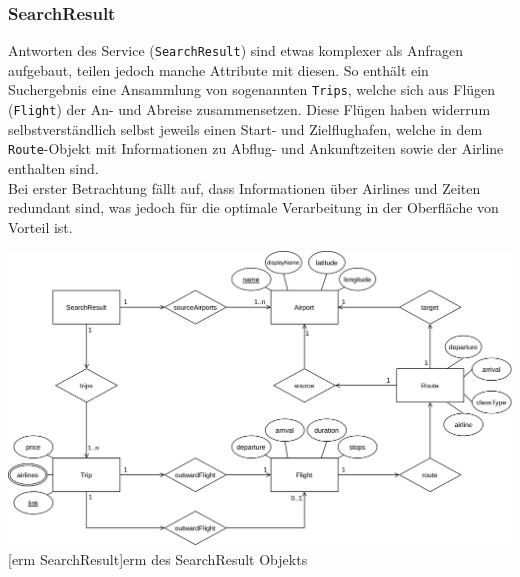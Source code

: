 \documentclass[12pt,twoside,a4paper]{article}
\begin{document}
\begin{sloppypar}
\subsubsection{SearchResult}
Antworten des Service (\texttt{SearchResult}) sind etwas komplexer als Anfragen aufgebaut, teilen jedoch manche Attribute mit diesen. So enthält ein Suchergebnis eine Ansammlung von sogenannten \texttt{Trips}, welche sich aus Flügen (\texttt{Flight}) der An- und Abreise zusammensetzen. Diese Flügen haben widerrum selbstverständlich selbst jeweils einen Start- und Zielflughafen, welche in dem \texttt{Route}-Objekt mit Informationen zu Abflug- und Ankunftzeiten sowie der Airline enthalten sind.\\
Bei erster Betrachtung fällt auf, dass Informationen über Airlines und Zeiten redundant sind, was jedoch für die optimale Verarbeitung in der Oberfläche von Vorteil ist.
\begin{center}
	\captionsetup{type=figure}
	\includegraphics[width=\textwidth]{images/datamodel-SearchResult}
	[\acrshort{erm} SearchResult]{\acrlong{erm} des SearchResult Objekts}
\end{center}

\end{sloppypar}
\end{document}
